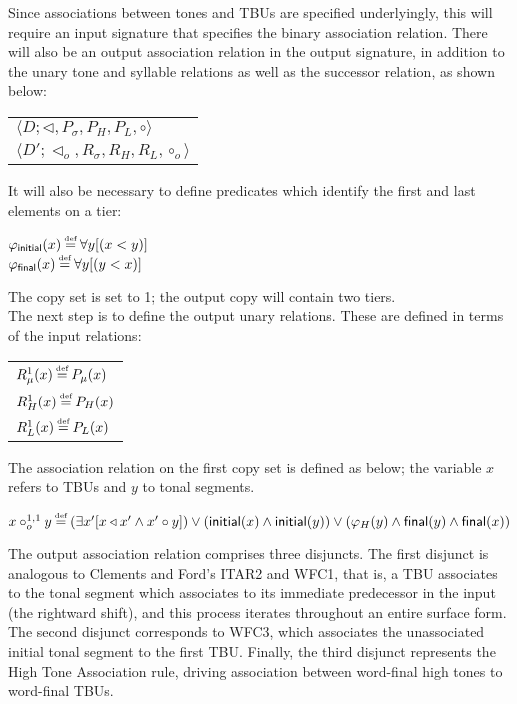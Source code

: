 \documentclass{article}
\newcommand\myeq{\mathrel{\stackrel{\makebox[0pt]{\mbox{\normalfont\tiny def}}}{=}}}
\begin{document}
Since associations between tones and TBUs are specified underlyingly, this will require an input signature that specifies the binary association relation. There will also be an output association relation in the output signature, in addition to the unary tone and syllable relations as well as the successor relation, as shown below:
\begin{center}
\begin{tabular}{l}
$\langle D; \triangleleft, P_{\sigma}, P_{H}, P_{L}, \circ \rangle$\\
$\langle D'; \triangleleft_{o}, R_{\sigma}, R_{H}, R_{L}, \circ_{o} \rangle$\\
\end{tabular}
\end{center}
It will also be necessary to define predicates which identify the first and last elements on a tier:
\begin{center}
$\varphi_{\mathsf{initial}}(x) \myeq \forall y [ (x < y)]$\\
$\varphi_{\mathsf{final}}(x) \myeq \forall y [ (y < x)]$
\end{center}
The copy set is set to {1}; the output copy will contain two tiers.\\
The next step is to define the output unary relations. These are defined in terms of the input relations:
\begin{center}
\begin{tabular}{l}
$R^{1}_{\mu}(x) \myeq P_{\mu}(x)$\\
$R^{1}_{H}(x) \myeq P_{H}(x)$\\
$R^{1}_{L}(x) \myeq P_{L}(x)$\\
\end{tabular}
\end{center}
The association relation on the first copy set is defined as below; the variable $x$ refers to TBUs and $y$ to tonal segments.
\begin{center}
$x \circ^{1,1}_{o} y \myeq (\exists x'[ x \triangleleft x' \wedge x' \circ y]) \vee ( \mathsf{initial}(x) \wedge \mathsf{initial}(y)) \vee (\varphi_{H}(y) \wedge \mathsf{final}(y) \wedge \mathsf{final}(x))$
\end{center}
The output association relation comprises three disjuncts. The first disjunct is analogous to Clements and Ford's ITAR2 and WFC1, that is, a TBU associates to the tonal segment which associates to its immediate predecessor in the input (the rightward shift), and this process iterates throughout an entire surface form. The second disjunct corresponds to WFC3, which associates the unassociated initial tonal segment to the first TBU. Finally, the third disjunct represents the High Tone Association rule, driving association between word-final high tones to word-final TBUs.
\end{document}
